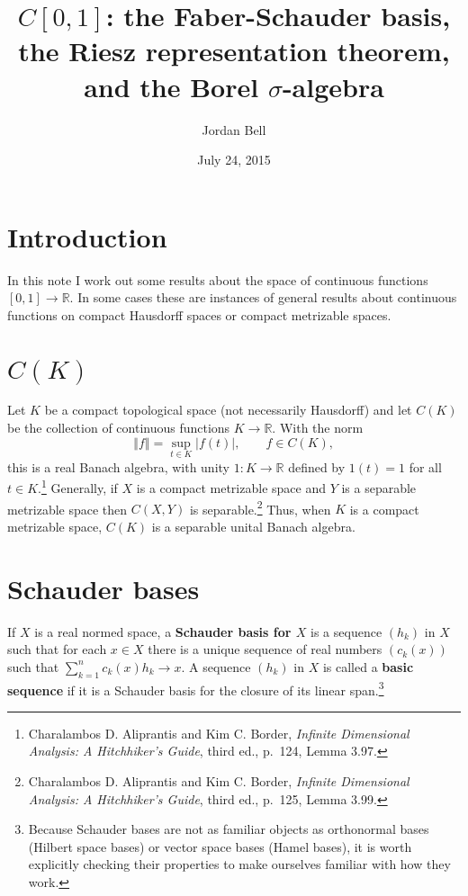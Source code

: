 \documentclass{article}
\newcommand{\norm}[1]{\left\Vert #1 \right\Vert}
\theoremstyle{definition}
\theoremstyle{definition}
\begin{document}
\title{$C[0,1]$: the Faber-Schauder basis,  the Riesz representation theorem, and the  Borel $\sigma$-algebra}
\author{Jordan Bell}
\date{July 24, 2015}

\maketitle

\section{Introduction}
In this note I work out some results about the space of continuous functions $[0,1] \to \mathbb{R}$. 
In some cases these are instances of general results about continuous functions on compact Hausdorff spaces or compact metrizable
spaces. 


\section{$C(K)$}
Let $K$ be a compact topological space (not necessarily Hausdorff) and let $C(K)$ be the collection of continuous functions $K \to \mathbb{R}$.
With the norm
\[
\norm{f} = \sup_{t \in K} |f(t)|,\qquad f \in C(K),
\]
this is a real Banach algebra, with unity $1:K \to \mathbb{R}$ defined by $1(t)=1$ for all $t \in K$.\footnote{Charalambos D. Aliprantis
and Kim C. Border, {\em Infinite Dimensional Analysis: A Hitchhiker's Guide}, third ed., p.~124, Lemma 3.97.}
Generally, if $X$ is a compact metrizable space and 
$Y$ is a separable metrizable space then $C(X,Y)$ is separable.\footnote{Charalambos D. Aliprantis
and Kim C. Border, {\em Infinite Dimensional Analysis: A Hitchhiker's Guide}, third ed., p.~125, Lemma 3.99.}
Thus, when $K$ is a compact metrizable space, $C(K)$ is a separable unital Banach algebra. 


\section{Schauder bases}
If $X$ is a real normed space, a \textbf{Schauder basis for $X$} is a 
sequence $(h_k)$ in $X$ such that for each $x \in X$ there is a unique sequence of real numbers $(c_k(x))$ such that 
$\sum_{k=1}^n c_k(x) h_k \to x$. A sequence $(h_k)$ in $X$ is called a \textbf{basic sequence} if it is a Schauder basis for the closure of
its linear span.\footnote{Because Schauder bases are not as familiar objects as orthonormal bases (Hilbert space
bases) or vector space
bases (Hamel bases), it is worth explicitly checking their properties to make ourselves familiar with how they work.}
\end{document}
